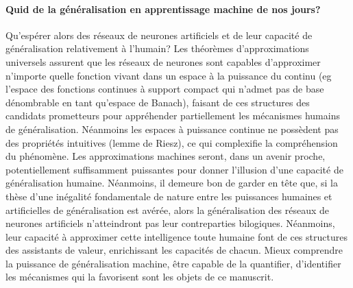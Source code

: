\paragraph{Quid de la généralisation en apprentissage machine de nos jours?}
     Qu'espérer alors des réseaux de neurones artificiels et de leur capacité de généralisation relativement à l'humain? Les théorèmes d'approximations universels assurent que les réseaux de neurones sont capables d'approximer n'importe quelle fonction vivant dans un espace à la puissance du continu (eg l'espace des fonctions continues à support compact qui n'admet pas de base dénombrable en tant qu'espace de Banach), faisant de ces structures des candidats prometteurs pour appréhender partiellement les mécanismes humains de généralisation.
     Néanmoins les espaces à puissance continue ne possèdent pas des propriétés intuitives (lemme de Riesz), ce qui complexifie la compréhension du phénomène. Les approximations machines seront, dans un avenir proche, potentiellement suffisamment puissantes pour donner l'illusion d'une capacité de généralisation humaine. Néanmoins, il demeure bon de garder en tête que, si la thèse d'une inégalité fondamentale de nature entre les puissances humaines et artificielles de généralisation est avérée, alors la généralisation des réseaux de neurones artificiels n'atteindront pas leur contreparties bilogiques. Néanmoins, leur capacité à approximer cette intelligence toute humaine font de ces structures des assistants de valeur, enrichissant les capacités de chacun.  Mieux comprendre la puissance de généralisation machine, être capable de la quantifier, d'identifier les mécanismes qui la favorisent sont les objets de ce manuscrit.  

    
    
